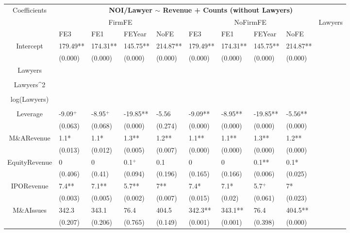 \documentclass{article}
\begin{document}
\begin{table}[H]
\centering
\begin{tabular}{|clllllllll|}
\hline
\multirow{3}{*}{Coefficients} & \multicolumn{9}{c|}{\textbf{NOI/Lawyer $\sim$ Revenue + Counts (without Lawyers)}} \\
\cline{2-10}
& \multicolumn{4}{c}{FirmFE} & \multicolumn{4}{c}{NoFirmFE} & \multirow{2}{*}{Lawyers} \\
\cline{2-9}
& FE3 & FE1 & FEYear & NoFE & FE3 & FE1 & FEYear & NoFE &  \\
\hline
 
Intercept & 179.49** & 174.31** & 145.75** & 214.87** & 179.49** & 174.31** & 145.75** & 214.87** & \\ 
   & (0.000) & (0.000) & (0.000) & (0.000) & (0.000) & (0.000) & (0.000) & (0.000) & \\ 
  Lawyers &  &  &  &  &  &  &  &  & \\ 
   &  &  &  &  &  &  &  &  & \\ 
  Lawyers^2 &  &  &  &  &  &  &  &  & \\ 
   &  &  &  &  &  &  &  &  & \\ 
  log(Lawyers) &  &  &  &  &  &  &  &  & \\ 
   &  &  &  &  &  &  &  &  & \\ 
  Leverage & -9.09$^{+}$ & -8.95$^{+}$ & -19.85** & -5.56 & -9.09** & -8.95** & -19.85** & -5.56** & \\ 
   & (0.063) & (0.068) & (0.000) & (0.274) & (0.000) & (0.000) & (0.000) & (0.000) & \\ 
  M\&ARevenue & 1.1* & 1.1* & 1.3** & 1.2** & 1.1** & 1.1** & 1.3** & 1.2** & \\ 
   & (0.013) & (0.012) & (0.005) & (0.007) & (0.000) & (0.000) & (0.000) & (0.000) & \\ 
  EquityRevenue & 0 & 0 & 0.1$^{+}$ & 0.1 & 0 & 0 & 0.1** & 0.1* & \\ 
   & (0.406) & (0.41) & (0.094) & (0.196) & (0.165) & (0.166) & (0.006) & (0.025) & \\ 
  IPORevenue & 7.4** & 7.1** & 5.7** & 7** & 7.4* & 7.1* & 5.7$^{+}$ & 7* & \\ 
   & (0.003) & (0.005) & (0.002) & (0.007) & (0.015) & (0.02) & (0.061) & (0.023) & \\ 
  M\&AIssues & 342.3 & 343.1 & 76.4 & 404.5 & 342.3** & 343.1** & 76.4 & 404.5** & \\ 
   & (0.207) & (0.206) & (0.765) & (0.149) & (0.001) & (0.001) & (0.398) & (0.000) & \\ 

\end{tabular}
\end{table}
\end{document}
